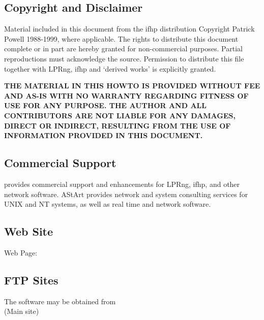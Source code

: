 \documentclass[a4paper]{article}
\begin{document}
\subsection{Copyright and Disclaimer}

Material included in this document from the {\ttfamily ifhp} distribution
Copyright Patrick Powell 1988-1999, where applicable.
The rights to distribute this document complete or in part are hereby
granted for non-commercial purposes. Partial reproductions must
acknowledge the source.
Permission to distribute this file together with LPRng, {\ttfamily ifhp} and `derived
works' is explicitly granted.

{\bfseries THE MATERIAL IN THIS HOWTO IS PROVIDED WITHOUT FEE AND AS-IS WITH NO
WARRANTY REGARDING FITNESS OF USE FOR ANY PURPOSE. THE AUTHOR AND ALL
CONTRIBUTORS ARE NOT LIABLE FOR ANY DAMAGES, DIRECT OR INDIRECT,
RESULTING FROM THE USE OF INFORMATION PROVIDED IN THIS DOCUMENT.}


\subsection{Commercial Support}

provides commercial support and enhancements for
LPRng, {\ttfamily ifhp}, and other network software.
AStArt provides network and system consulting services for UNIX and NT
systems, as well as real time and network software.


\subsection{Web Site}

Web Page:

\label{secftp}


\subsection{FTP Sites}

The software may be obtained from \\ 
(Main site)\\ 
\end{document}

